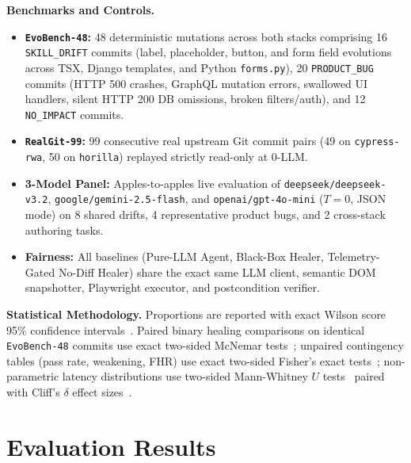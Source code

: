 \documentclass[conference]{IEEEtran}
\begin{document}
\textbf{Benchmarks and Controls.}
\begin{itemize}
  \item \textbf{\texttt{EvoBench-48}:} 48 deterministic mutations across both stacks comprising 16 \texttt{SKILL\_DRIFT} commits (label, placeholder, button, and form field evolutions across TSX, Django templates, and Python \texttt{forms.py}), 20 \texttt{PRODUCT\_BUG} commits (HTTP 500 crashes, GraphQL mutation errors, swallowed UI handlers, silent HTTP 200 DB omissions, broken filters/auth), and 12 \texttt{NO\_IMPACT} commits.
  \item \textbf{\texttt{RealGit-99}:} 99 consecutive real upstream Git commit pairs (49 on \texttt{cypress-rwa}, 50 on \texttt{horilla}) replayed strictly read-only at 0-LLM.
  \item \textbf{3-Model Panel:} Apples-to-apples live evaluation of \texttt{deepseek/deepseek-v3.2}, \texttt{google/gemini-2.5-flash}, and \texttt{openai/gpt-4o-mini} ($T = 0$, JSON mode) on 8 shared drifts, 4 representative product bugs, and 2 cross-stack authoring tasks.
  \item \textbf{Fairness:} All baselines (Pure-LLM Agent, Black-Box Healer, Telemetry-Gated No-Diff Healer) share the exact same LLM client, semantic DOM snapshotter, Playwright executor, and postcondition verifier.
\end{itemize}

\textbf{Statistical Methodology.} Proportions are reported with exact Wilson score 95\% confidence intervals~\cite{wilson1927}. Paired binary healing comparisons on identical \texttt{EvoBench-48} commits use exact two-sided McNemar tests~\cite{mcnemar1947}; unpaired contingency tables (pass rate, weakening, FHR) use exact two-sided Fisher's exact tests~\cite{fisher1922}; non-parametric latency distributions use two-sided Mann-Whitney $U$ tests~\cite{mann1947} paired with Cliff's $\delta$ effect sizes~\cite{cliff1993,romano2006}.

\section{Evaluation Results}
\end{document}
